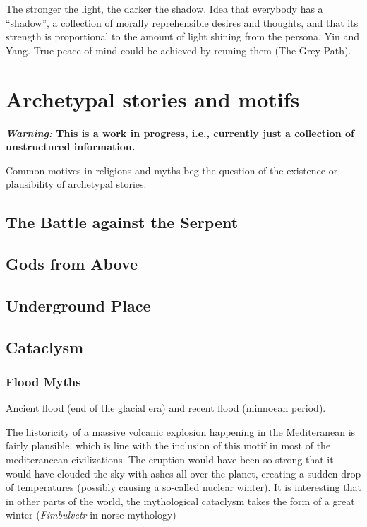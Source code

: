 \documentclass[
]{book}
\begin{document}
The stronger the light, the darker the shadow.
Idea that everybody has a ``shadow'', a collection of morally reprehensible desires and thoughts, and that its strength is proportional to the amount of light shining from the persona. Yin and Yang. True peace of mind could be achieved by reuning them (The Grey Path).

\hypertarget{archetypal-stories-and-motifs}{%
\chapter{Archetypal stories and motifs}\label{archetypal-stories-and-motifs}}

\textbf{\emph{Warning:} This is a work in progress, i.e., currently just a collection of unstructured information.}

Common motives in religions and myths beg the question of the existence or plausibility of archetypal stories.

\hypertarget{the-battle-against-the-serpent}{%
\section{The Battle against the Serpent}\label{the-battle-against-the-serpent}}

\hypertarget{gods-from-above}{%
\section{Gods from Above}\label{gods-from-above}}

\hypertarget{underground-place}{%
\section{Underground Place}\label{underground-place}}

\hypertarget{cataclysm}{%
\section{Cataclysm}\label{cataclysm}}

\hypertarget{flood-myths}{%
\subsection{Flood Myths}\label{flood-myths}}

Ancient flood (end of the glacial era) and recent flood (minnoean period).

The historicity of a massive volcanic explosion happening in the Mediteranean is fairly plausible, which is line with the inclusion of this motif in most of the mediteraneean civilizations. The eruption would have been so strong that it would have clouded the sky with ashes all over the planet, creating a sudden drop of temperatures (possibly causing a so-called nuclear winter). It is interesting that in other parts of the world, the mythological cataclysm takes the form of a great winter (\emph{Fimbulvetr} in norse mythology)
\end{document}
